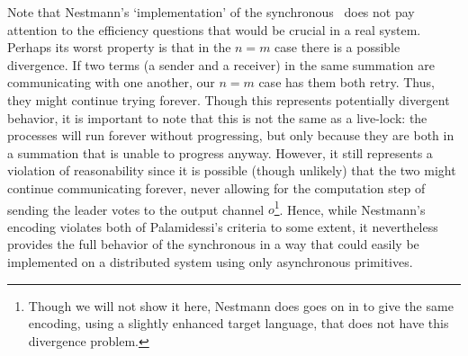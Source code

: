 Note that Nestmann's `implementation' of the synchronous \picalc\ does not pay attention to the efficiency questions that would be crucial in a real system.  Perhaps its worst property is that in the $n=m$ case there is a possible divergence.  If two terms (a sender and a receiver) in the same summation are communicating with one another, our $n=m$ case has them both retry.  Thus, they might continue trying forever.  Though this represents potentially divergent behavior, it is important to note that this is not the same as a live-lock: the processes will run forever without progressing, but only because they are both in a summation that is unable to progress anyway.  However, it still represents a violation of reasonability since it is possible (though unlikely) that the two might continue communicating forever, never allowing for the computation step of sending the leader votes to the output channel $o$\footnote{Though we will not show it here, Nestmann does goes on in \cite{nestm00} to give the same encoding, using a slightly enhanced target language, that does not have this divergence problem.}.  Hence, while Nestmann's encoding violates both of Palamidessi's criteria to some extent, it nevertheless provides the full behavior of the synchronous in a way that could easily be implemented on a distributed system using only asynchronous primitives.